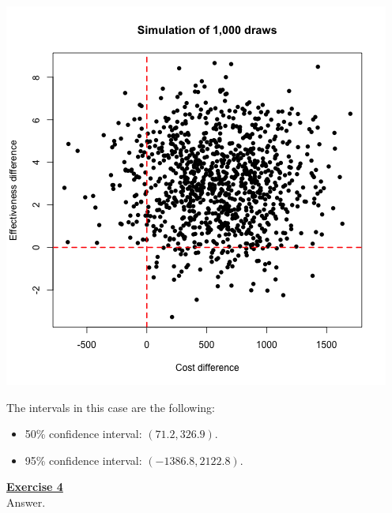 \documentclass[a4paper, 11pt]{article}
\begin{document}
\begin{center}
\includegraphics[scale=0.6]{plot_ex3dot3.png}
\end{center}
The intervals in this case are the following:
\begin{itemize}
\item 50\% confidence interval: $(71.2, 326.9)$.
\item 95\% confidence interval: $(-1386.8, 2122.8)$.
\end{itemize}
\newpage
\textbf{\underline{Exercise 4}}\\
\newline Answer.
\end{document}
